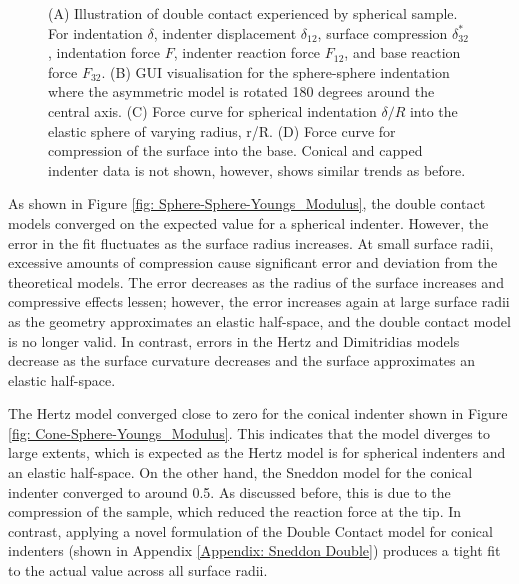 \begin{figure}[H]
    \caption{\label{fig: Sphere-Sphere-Result}(A) Illustration of double contact experienced by spherical sample. For indentation $\delta$, indenter displacement $\delta_{12}$, surface compression $\delta^*_{32}$, indentation force $F$, indenter reaction force $F_{12}$, and base reaction force $F_{32}$. (B) GUI visualisation for the sphere-sphere indentation where the asymmetric model is rotated 180 degrees around the central axis. (C) Force curve for spherical indentation $\delta/R$ into the elastic sphere of varying radius, r/R. (D) Force curve for compression of the surface into the base. Conical and capped indenter data is not shown, however, shows similar trends as before.}
    
\end{figure}

As shown in Figure \ref{fig: Sphere-Sphere-Youngs_Modulus}, the double contact models converged on the expected value for a spherical indenter. However, the error in the fit fluctuates as the surface radius increases. At small surface radii, excessive amounts of compression cause significant error and deviation from the theoretical models. The error decreases as the radius of the surface increases and compressive effects lessen; however, the error increases again at large surface radii as the geometry approximates an elastic half-space, and the double contact model is no longer valid. In contrast, errors in the Hertz and Dimitridias models decrease as the surface curvature decreases and the surface approximates an elastic half-space.

The Hertz model converged close to zero for the conical indenter shown in Figure \ref{fig: Cone-Sphere-Youngs_Modulus}. This indicates that the model diverges to large extents, which is expected as the Hertz model is for spherical indenters and an elastic half-space. On the other hand, the Sneddon model for the conical indenter converged to around 0.5. As discussed before, this is due to the compression of the sample, which reduced the reaction force at the tip. In contrast, applying a novel formulation of the Double Contact model for conical indenters (shown in Appendix \ref{Appendix: Sneddon Double}) produces a tight fit to the actual value across all surface radii.

